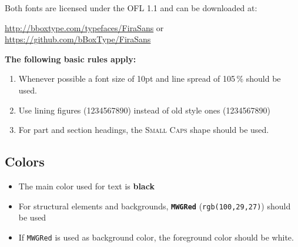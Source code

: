 \documentclass[10pt,DIV=11,abstracton]{scrartcl}
\begin{document}
    \medskip
    Both fonts are licensed under the OFL 1.1 and can be downloaded at:
    \begin{center}
        \url{http://bboxtype.com/typefaces/FiraSans} or \\
        \url{https://github.com/bBoxType/FiraSans}
    \end{center}
    
    \medskip
    \textbf{The following basic rules apply:} \nopagebreak
    \begin{enumerate}
        \item Whenever possible a font size of 10pt and line spread of 105\,\% should be used.
        \item Use lining figures (1234567890) instead of old style ones {(1234567890)}
        \item For part and section headings, the \textsc{Small Caps} shape should be used.
    \end{enumerate}
    
    
    \subsection{Colors}
    \begin{itemize}\itemsep0pt
        \item The main color used for text is \textbf{black}
        \item For structural elements and backgrounds, \textbf{\color{MWGRed}\texttt{MWGRed}} (\texttt{rgb(100,29,27)}) should be used
        \item If {\color{MWGRed}\texttt{MWGRed}} is used as background color, the foreground color should be white.
    \end{itemize}
    
    
\end{document}
